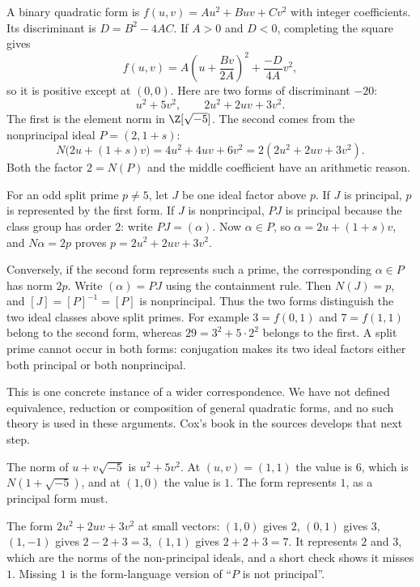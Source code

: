 A binary quadratic form is $f(u,v)=Au^2+Buv+Cv^2$ with integer
coefficients. Its discriminant is $D=B^2-4AC$.
If $A>0$ and $D<0$, completing the square gives
\[
f(u,v)=A\left(u+\frac{Bv}{2A}\right)^2
       +\frac{-D}{4A}v^2,
\]
so it is positive except at $(0,0)$.
Here are two forms of discriminant $-20$:
\[
u^2+5v^2,\qquad 2u^2+2uv+3v^2.
\]
The first is the element norm in $\Z[\sqrt{-5}]$.
The second comes from the nonprincipal ideal $P=(2,1+s)$:
\[
N\bigl(2u+(1+s)v\bigr)
=4u^2+4uv+6v^2=2(2u^2+2uv+3v^2).
\]
Both the factor $2=N(P)$ and the middle coefficient have an arithmetic reason.

For an odd split prime $p\ne5$, let $J$ be one ideal factor above $p$.
If $J$ is principal, $p$ is represented by the first form.
If $J$ is nonprincipal, $PJ$ is principal because the class group has
order $2$: write $PJ=(\alpha)$. Now $\alpha\in P$, so
$\alpha=2u+(1+s)v$, and $N\alpha=2p$ proves
$p=2u^2+2uv+3v^2$.

Conversely, if the second form represents such a prime, the corresponding
$\alpha\in P$ has norm $2p$. Write $(\alpha)=PJ$ using the containment
rule. Then $N(J)=p$, and $[J]=[P]^{-1}=[P]$ is nonprincipal.
Thus the two forms distinguish the two ideal classes above split primes.
For example $3=f(0,1)$ and $7=f(1,1)$ belong to the second form,
whereas $29=3^2+5\cdot2^2$ belongs to the first.
A split prime cannot occur in both forms: conjugation makes its two
ideal factors either both principal or both nonprincipal.

This is one concrete instance of a wider correspondence.
We have not defined equivalence, reduction or composition of general
quadratic forms, and no such theory is used in these arguments.
Cox's book in the sources develops that next step.

\begin{examplex}
The norm of $u+v\sqrt{-5}$ is $u^2+5v^2$. At $(u,v)=(1,1)$ the value is $6$, which is $N(1+\sqrt{-5})$, and at $(1,0)$ the value is $1$. The form represents $1$, as a principal form must.
\end{examplex}

\begin{examplex}
The form $2u^2+2uv+3v^2$ at small vectors: $(1,0)$ gives $2$, $(0,1)$ gives $3$, $(1,-1)$ gives $2-2+3=3$, $(1,1)$ gives $2+2+3=7$. It represents $2$ and $3$, which are the norms of the non-principal ideals, and a short check shows it misses $1$. Missing $1$ is the form-language version of ``$P$ is not principal''.
\end{examplex}

